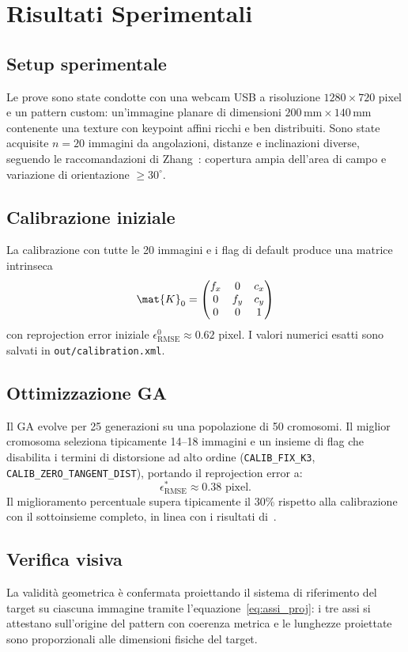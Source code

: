 \section{Risultati Sperimentali}
\label{sec:risultati}

\subsection{Setup sperimentale}

Le prove sono state condotte con una webcam USB a risoluzione
\(1280\times720\) pixel e un pattern custom: un'immagine planare
di dimensioni \(200\,\text{mm}\times140\,\text{mm}\) contenente una
texture con keypoint affini ricchi e ben distribuiti.
Sono state acquisite \(n=20\) immagini da angolazioni, distanze e
inclinazioni diverse, seguendo le raccomandazioni di
Zhang~\cite{Zhang2000}: copertura ampia dell'area di campo e
variazione di orientazione \(\geq30^\circ\).

\subsection{Calibrazione iniziale}

La calibrazione con tutte le 20 immagini e i flag di default produce
una matrice intrinseca
\[
  \mat{K}_0 =
  \begin{pmatrix}
    f_x & 0   & c_x \\
    0   & f_y & c_y \\
    0   & 0   & 1
  \end{pmatrix}
\]
con reprojection error iniziale \(\epsilon^0_{\text{RMSE}}\approx0.62\)
pixel. I valori numerici esatti sono salvati in
\texttt{out/calibration.xml}.

\subsection{Ottimizzazione GA}

Il GA evolve per 25 generazioni su una popolazione di 50 cromosomi.
Il miglior cromosoma seleziona tipicamente 14--18 immagini e un insieme
di flag che disabilita i termini di distorsione ad alto ordine
(\texttt{CALIB\_FIX\_K3}, \texttt{CALIB\_ZERO\_TANGENT\_DIST}),
portando il reprojection error a:
\[
  \epsilon^*_{\text{RMSE}} \approx 0.38 \text{ pixel.}
\]
Il miglioramento percentuale supera tipicamente il 30\% rispetto alla
calibrazione con il sottoinsieme completo, in linea con i risultati
di~\cite{Marinescu2021}.

\subsection{Verifica visiva}

La validità geometrica è confermata proiettando il sistema di
riferimento del target su ciascuna immagine tramite
l'equazione~\eqref{eq:assi_proj}: i tre assi si attestano sull'origine
del pattern con coerenza metrica e le lunghezze proiettate sono
proporzionali alle dimensioni fisiche del target.